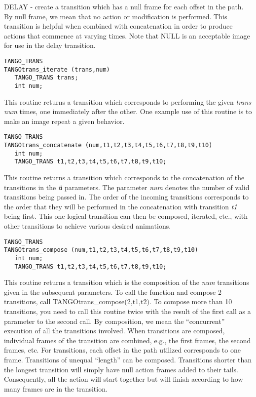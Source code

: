 DELAY - create a transition which has a null frame for each offset in the
path.  By null frame, we mean that no action or modification is performed.
This transition is helpful when combined with concatenation in order to
produce actions that commence at varying times.  Note that NULL is an
acceptable image for use in the delay transition.


\vspace{1em}
\begin{verbatim}
TANGO_TRANS
TANGOtrans_iterate (trans,num) 
   TANGO_TRANS trans;
   int num;
\end{verbatim}
This routine returns a transition which corresponds to performing the given
{\em trans} {\em num} times, one immediately after the other.  One
example
use of this routine is to make an image repeat a given behavior.

\vspace{1em}
\begin{verbatim}
TANGO_TRANS
TANGOtrans_concatenate (num,t1,t2,t3,t4,t5,t6,t7,t8,t9,t10) 
   int num;
   TANGO_TRANS t1,t2,t3,t4,t5,t6,t7,t8,t9,t10;
\end{verbatim}
This routine returns a transition which corresponds to the concatenation of
the transitions in the {\em t}i parameters. The parameter
{\em num} denotes the number of valid transitions being passed in.  The order
of
the incoming transitions corresponds to the order that they will be
performed
in the concatenation with transition {\em t1} being first.
This one logical transition can then be composed, iterated, etc.,  with other
transitions to achieve various desired animations.

\vspace{1em}
\begin{verbatim}
TANGO_TRANS
TANGOtrans_compose (num,t1,t2,t3,t4,t5,t6,t7,t8,t9,t10) 
   int num;
   TANGO_TRANS t1,t2,t3,t4,t5,t6,t7,t8,t9,t10;
\end{verbatim}
This routine returns a transition which is the composition of the {\em num}
transitions given in the subsequent parameters.  To call the function and
compose 2 transitions, call TANGOtrans\_compose(2,t1,t2).  To compose more
than 10 transitions, you need to call this routine twice with the result
of the first call as a parameter to the second call.
By composition,
we mean the ``concurrent'' execution of all the transitions involved.  When
transitions are composed, individual frames of the transition are combined,
e.g., the first frames, the second frames, etc.  For transitions, each offset
in the path utilized corresponds to one frame.  Transitions of unequal
``length'' can be composed.  Transitions shorter than the longest transition
will simply have null action frames added to their tails.  Consequently, all
the action will start together but will finish according to how many frames
are in the transition.

